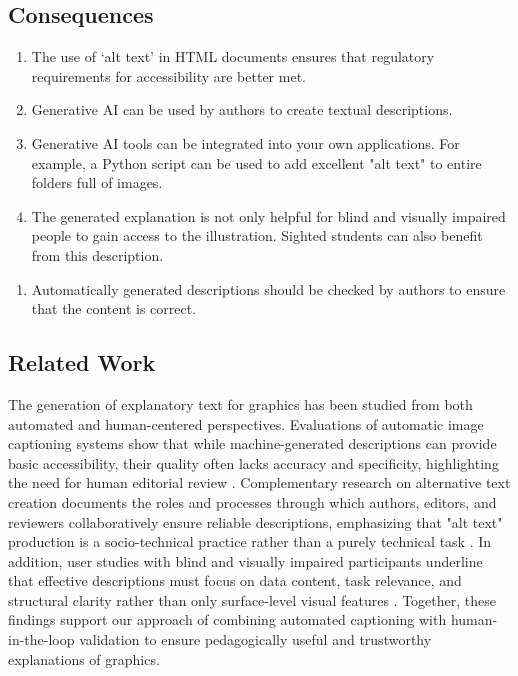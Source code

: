 


\subsection*{Consequences}

\renewcommand{\labelenumi}{$+$}
\begin{enumerate}
\item The use of ‘alt text’ in HTML documents ensures that regulatory requirements for accessibility are better met. 

\item Generative AI can be used by authors to  create textual descriptions.

\item Generative AI tools can be integrated into your own applications. For example, a Python script can be used to add excellent "alt text" to entire folders full of images.


\item The generated explanation is not only helpful for blind and visually impaired people to gain access to the illustration. Sighted students can also benefit from this description.
\end{enumerate}

\renewcommand{\labelenumi}{$-$}
\begin{enumerate}
\item Automatically generated descriptions should be checked by authors to ensure that the content is correct.
\end{enumerate}
 
\subsection*{Related Work}

The generation of explanatory text for graphics has been studied from both
automated and human-centered perspectives. Evaluations of automatic image
captioning systems show that while machine-generated descriptions can provide
basic accessibility, their quality often lacks accuracy and specificity,
highlighting the need for human editorial review
\cite{Leotta2023AutoCaptioning}. Complementary research on alternative text
creation documents the roles and processes through which authors, editors, and
reviewers collaboratively ensure reliable descriptions, emphasizing that
"alt text" production is a socio-technical practice rather than a purely
technical task \cite{Edwards2023AltTextProcess}. In addition, user studies with
blind and visually impaired participants underline that effective descriptions
must focus on data content, task relevance, and structural clarity rather than
only surface-level visual features \cite{Jung2021AltText}. Together, these
findings support our approach of combining automated captioning with
human-in-the-loop validation to ensure pedagogically useful and trustworthy
explanations of graphics.